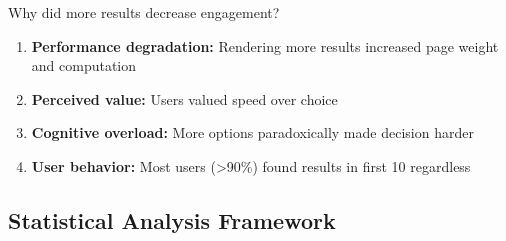 Why did more results decrease engagement?

\begin{enumerate}
    \item \textbf{Performance degradation:} Rendering more results increased page weight and computation
    \item \textbf{Perceived value:} Users valued speed over choice
    \item \textbf{Cognitive overload:} More options paradoxically made decision harder
    \item \textbf{User behavior:} Most users (>90\%) found results in first 10 regardless
\end{enumerate}

\subsection{Statistical Analysis Framework}

